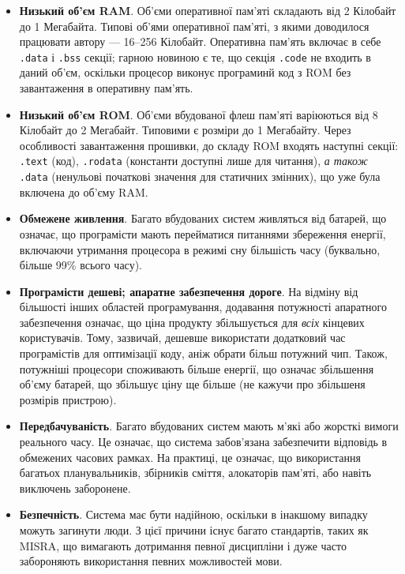 \documentclass[main.tex]{subfiles}
\begin{document}
\newcommand\elfsection[1]{\texttt{#1}}

\begin{itemize}[nosep]
\item \textbf{Низький об'єм RAM}. Об'єми оперативної пам'яті складають від 2 Кілобайт до 1 Мегабайта. Типові об'ями оперативної пам'яті, з якими доводилося працювати автору --- 16--256 Кілобайт. Оперативна пам'ять включає в себе \elfsection{.data} і \elfsection{.bss} секції; гарною новиною є те, що секція \elfsection{.code} не входить в даний об'єм, оскільки процесор виконує програминй код з ROM без завантаження в оперативну пам'ять.

\item \textbf{Низький об'єм ROM}. Об'єми вбудованої флеш пам'яті варіюються від 8 Кілобайт до 2 Мегабайт. Типовими є розміри до 1 Мегабайту. Через особливості завантаження прошивки, до складу ROM входять наступні секції: \elfsection{.text} (код), \elfsection{.rodata} (константи доступні лише для читання), \emph{а також} \elfsection{.data} (ненульові початкові значення для статичних змінних), що уже була включена до об'єму RAM.

\item \textbf{Обмежене живлення}. Багато вбудованих систем живляться від батарей, що означає, що програмісти мають перейматися питаннями збереження енергії, включаючи утримання процесора в режимі сну більшість часу (буквально, більше 99\% всього часу\cite{processor-sleep}).

\item \textbf{Програмісти дешеві; апаратне забезпечення дороге}. На відміну від більшості інших областей програмування\cite{hardware-is-cheap}, додавання потужності апаратного забезпечення означає, що ціна продукту збільшується для \emph{всіх} кінцевих користувачів. Тому, зазвичай, дешевше використати додатковий час програмістів для оптимізації коду, аніж обрати більш потужний чип. Також, потужніші процесори споживають більше енергії, що означає збільшення об'єму батарей, що збільшує ціну ще більше (не кажучи про збільшеня розмірів пристрою).

\item \textbf{Передбачуваність}. Багато вбудованих систем мають м'які або жорсткі вимоги реального часу. Це означає, що система забов'язана забезпечити відповідь в обмежених часових рамках. На практиці, це означає, що використання багатьох планувальників, збірників сміття, алокаторів пам'яті, або навіть виключень заборонене.

\item \textbf{Безпечність}. Система має бути надійною, оскільки в інакшому випадку можуть загинути люди. З цієї причини існує багато стандартів, таких як MISRA\cite{misra}, що вимагають дотримання певної дисципліни і дуже часто забороняють використання певних можливостей мови.


\end{itemize}
\end{document}
